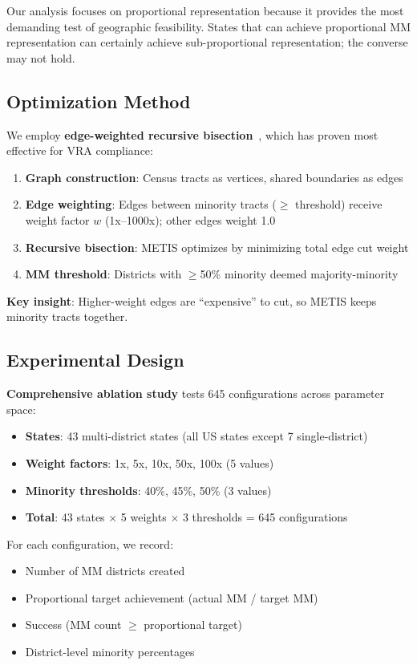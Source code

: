 Our analysis focuses on proportional representation because it provides the most demanding test of geographic feasibility. States that can achieve proportional MM representation can certainly achieve sub-proportional representation; the converse may not hold.

\subsection{Optimization Method}

We employ \textbf{edge-weighted recursive bisection}~\citep{dellaLibera2026edgeWeighted}, which has proven most effective for VRA compliance:

\begin{enumerate}
    \item \textbf{Graph construction}: Census tracts as vertices, shared boundaries as edges
    \item \textbf{Edge weighting}: Edges between minority tracts ($\geq$ threshold) receive weight factor $w$ (1x--1000x); other edges weight 1.0
    \item \textbf{Recursive bisection}: METIS optimizes by minimizing total edge cut weight
    \item \textbf{MM threshold}: Districts with $\geq$50\% minority deemed majority-minority
\end{enumerate}

\textbf{Key insight}: Higher-weight edges are ``expensive'' to cut, so METIS keeps minority tracts together.

\subsection{Experimental Design}

\textbf{Comprehensive ablation study} tests 645 configurations across parameter space:
\begin{itemize}
    \item \textbf{States}: 43 multi-district states (all US states except 7 single-district)
    \item \textbf{Weight factors}: 1x, 5x, 10x, 50x, 100x (5 values)
    \item \textbf{Minority thresholds}: 40\%, 45\%, 50\% (3 values)
    \item \textbf{Total}: 43 states $\times$ 5 weights $\times$ 3 thresholds = 645 configurations
\end{itemize}

For each configuration, we record:
\begin{itemize}
    \item Number of MM districts created
    \item Proportional target achievement (actual MM / target MM)
    \item Success (MM count $\geq$ proportional target)
    \item District-level minority percentages
\end{itemize}

